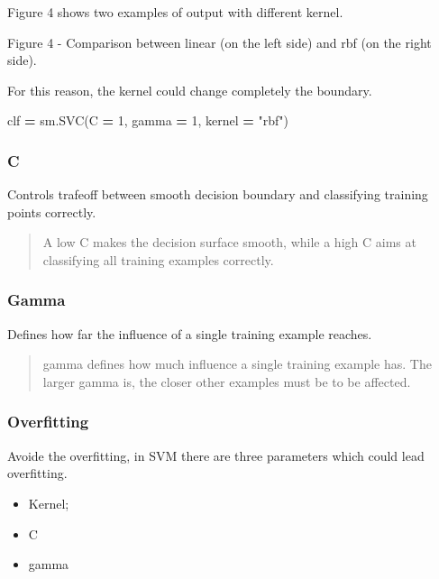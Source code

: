 \documentclass[]{book}
\newenvironment{Shaded}{\begin{snugshade}}{\end{snugshade}}
\newcommand{\DecValTok}[1]{\textcolor[rgb]{0.00,0.00,0.81}{#1}}
\newcommand{\StringTok}[1]{\textcolor[rgb]{0.31,0.60,0.02}{#1}}
\newcommand{\OperatorTok}[1]{\textcolor[rgb]{0.81,0.36,0.00}{\textbf{#1}}}
\newcommand{\NormalTok}[1]{#1}
\providecommand{\tightlist}{%
  \setlength{\itemsep}{0pt}\setlength{\parskip}{0pt}}
\begin{document}
Figure 4 shows two examples of output with different kernel.

Figure 4 - Comparison between linear (on the left side) and rbf (on the
right side).

For this reason, the kernel could change completely the boundary.

\begin{Shaded}
\begin{Highlighting}[]
\NormalTok{clf }\OperatorTok{=}\NormalTok{ sm.SVC(C }\OperatorTok{=} \DecValTok{1}\NormalTok{, gamma }\OperatorTok{=} \DecValTok{1}\NormalTok{, kernel }\OperatorTok{=} \StringTok{"rbf"}\NormalTok{)}
\end{Highlighting}
\end{Shaded}

\subsubsection{C}\label{c}

Controls trafeoff between smooth decision boundary and classifying
training points correctly.

\begin{quote}
A low C makes the decision surface smooth, while a high C aims at
classifying all training examples correctly.
\end{quote}

\subsubsection{Gamma}\label{gamma}

Defines how far the influence of a single training example reaches.

\begin{quote}
gamma defines how much influence a single training example has. The
larger gamma is, the closer other examples must be to be affected.
\end{quote}

\subsubsection{Overfitting}\label{overfitting}

Avoide the overfitting, in SVM there are three parameters which could
lead overfitting.

\begin{itemize}
\tightlist
\item
  Kernel;
\item
  C
\item
  gamma
\end{itemize}
\end{document}
